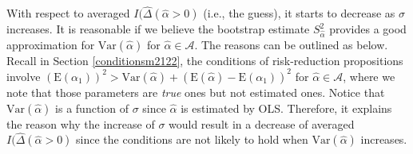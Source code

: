 \documentclass[11pt]{article}
\def\mc#1{\mathcal{#1}} %
\def\E#1{\mathrm{E}(#1)} %
\def\var#1{\mathrm{Var}(#1)} %
\theoremstyle{definition}
\begin{document}
With respect to averaged $I(\hat{\Delta}(\hat{\alpha}>0)$ (i.e., the guess), it starts to decrease as $\sigma$ increases. It is reasonable if we believe the bootstrap estimate $S^2_{\hat{\alpha}}$ provides a good approximation for $\var{\hat{\alpha}}$ for $\hat{\alpha}\in \mc{A}$. The reasons can be outlined as below. Recall in Section \ref{conditionsm2122}, the conditions of risk-reduction propositions involve $(\E{\alpha_1})^2 > \var{\hat{\alpha}} + (\E{\hat{\alpha}}-\E{\alpha_1})^2$ for $\hat{\alpha}\in \mc{A}$, where we note that those parameters are \emph{true} ones but not estimated ones. Notice that $\var{\hat{\alpha}}$ is  a function of $\sigma$ since $\hat{\alpha}$ is estimated by OLS. Therefore, it explains the reason why the increase of $\sigma$ would result in a decrease of averaged $I(\hat{\Delta}(\hat{\alpha}>0)$ since the conditions are not likely to hold when  $\var{\hat{\alpha}}$ increases.
\end{document}
